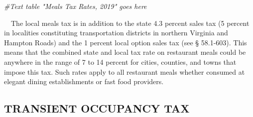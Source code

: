 \documentclass[
]{book}
\newenvironment{Shaded}{\begin{snugshade}}{\end{snugshade}}
\newcommand{\CommentTok}[1]{\textcolor[rgb]{0.56,0.35,0.01}{\textit{#1}}}
\begin{document}
\begin{Shaded}
\begin{Highlighting}[]
\CommentTok{\#Text table "Meals Tax Rates, 2019" goes here}
\end{Highlighting}
\end{Shaded}

\hfill\break
~~The local meals tax is in addition to the state 4.3 percent sales tax (5 percent in localities constituting transportation districts in northern Virginia and Hampton Roads) and the 1 percent local option sales tax (see § 58.1-603). This means that the combined state and local tax rate on restaurant meals could be anywhere in the range of 7 to 14 percent for cities, counties, and towns that impose this tax. Such rates apply to all restaurant meals whether consumed at elegant dining establishments or fast food providers.\\

\hypertarget{transient-occupancy-tax}{%
\subsection{TRANSIENT OCCUPANCY TAX}\label{transient-occupancy-tax}}
\end{document}
